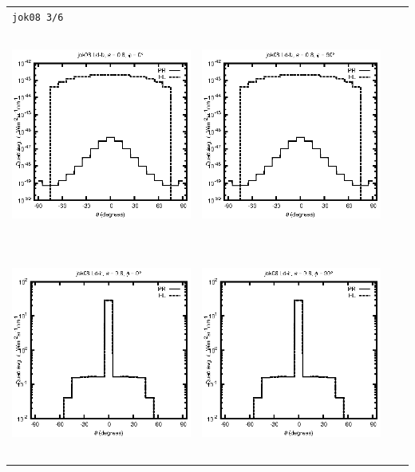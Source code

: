 \documentclass[10pt,a4paper]{article}
\begin{document}
\begin{adjustwidth}{-1.2in}{-1.2in}
\begin{tabular}{c c c c}
\multicolumn{4}{l}{\texttt{jok08 3/6}} \\
\includegraphics[height=7cm]{../eps/jok08_Ld_b_fwd.eps} &
\includegraphics[height=7cm]{../eps/jok08_Ld_b_cross.eps} \\
\includegraphics[height=7cm]{../eps/jok08_Ld_it_fwd.eps} &
\includegraphics[height=7cm]{../eps/jok08_Ld_it_cross.eps} \\

\end{tabular}
\end{adjustwidth}
\end{document}
